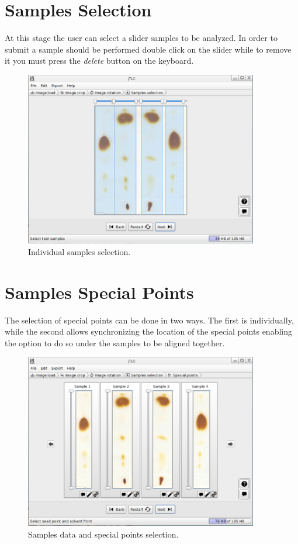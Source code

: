 \section{Samples Selection}
At this stage the user can select a slider samples to be analyzed. In order to submit a sample should be performed double click on the slider while to remove it you must press the \emph{delete} button on the keyboard.
\begin{figure}[H]
	\vspace{0cm}
	\centering
	\includegraphics[width=385px]{imagenes/selection}
	\centering
	\vspace{-0.4cm}
	\caption{Individual samples selection.}
	\label{fig:image_samples_selection}
	\vspace{-0.25cm}
\end{figure}
\newpage

\section{Samples Special Points}
The selection of special points can be done in two ways. The first is individually, while the second allows synchronizing the location of the special points enabling the option to do so under the samples to be aligned together.
\begin{figure}[H]
	\vspace{0cm}
	\centering
	\includegraphics[width=385px]{imagenes/points}
	\centering
	\vspace{-0.4cm}
	\caption{Samples data and special points selection.}
	\label{fig:image_samples_special_points}
	\vspace{-0.25cm}
\end{figure}
\newpage

